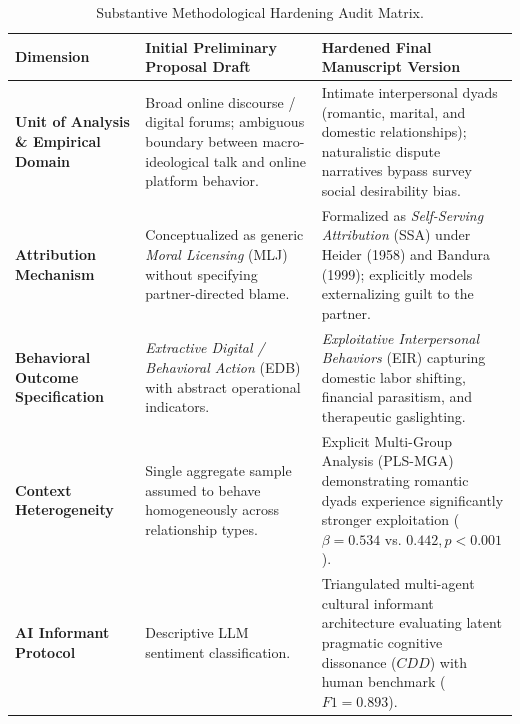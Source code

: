 \documentclass[11pt,a4paper]{article}
\begin{document}
\begin{table}[htbp]
\centering
\small
\begin{tabularx}{\textwidth}{>{\raggedright\arraybackslash}p{3cm}>{\raggedright\arraybackslash}X>{\raggedright\arraybackslash}X}
\toprule
\textbf{Dimension} & \textbf{Initial Preliminary Proposal Draft} & \textbf{Hardened Final Manuscript Version} \\
\midrule
\textbf{Unit of Analysis \& Empirical Domain} & Broad online discourse / digital forums; ambiguous boundary between macro-ideological talk and online platform behavior. & Intimate interpersonal dyads (romantic, marital, and domestic relationships); naturalistic dispute narratives bypass survey social desirability bias. \\
\addlinespace
\textbf{Attribution Mechanism} & Conceptualized as generic \textit{Moral Licensing} (MLJ) without specifying partner-directed blame. & Formalized as \textit{Self-Serving Attribution} (SSA) under Heider (1958) and Bandura (1999); explicitly models externalizing guilt to the partner. \\
\addlinespace
\textbf{Behavioral Outcome Specification} & \textit{Extractive Digital / Behavioral Action} (EDB) with abstract operational indicators. & \textit{Exploitative Interpersonal Behaviors} (EIR) capturing domestic labor shifting, financial parasitism, and therapeutic gaslighting. \\
\addlinespace
\textbf{Context Heterogeneity} & Single aggregate sample assumed to behave homogeneously across relationship types. & Explicit Multi-Group Analysis (PLS-MGA) demonstrating romantic dyads experience significantly stronger exploitation ($\beta = 0.534$ vs. $0.442, p < 0.001$). \\
\addlinespace
\textbf{AI Informant Protocol} & Descriptive LLM sentiment classification. & Triangulated multi-agent cultural informant architecture evaluating latent pragmatic cognitive dissonance ($CDD$) with human benchmark ($F1 = 0.893$). \\
\bottomrule
\end{tabularx}
\caption{Substantive Methodological Hardening Audit Matrix.}
\label{tab:hardening_matrix}
\end{table}

\newpage


\end{document}
